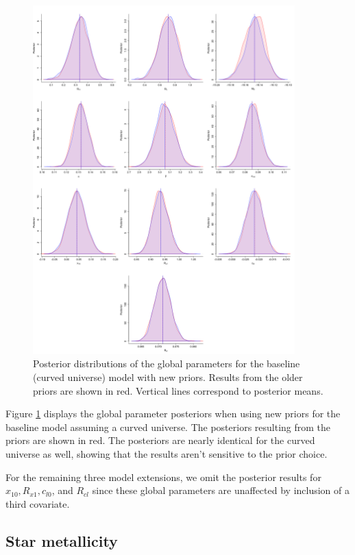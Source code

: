 \begin{figure}
\centering
	\includegraphics[width=0.9\textwidth]{figures/ode/base_curv_all.png}
\caption{Posterior distributions of the global parameters for the baseline (curved universe) model with new priors. Results from the older priors are shown in red. Vertical lines correspond to posterior means.}
\label{fig:ode_base_curv}
\end{figure}

Figure \ref{fig:ode_base_curv} displays the global parameter posteriors when using new priors for the baseline model assuming a curved universe. The posteriors resulting from the \citet{Shariff+others:2016} priors are shown in red. The posteriors are nearly identical for the curved universe as well, showing that the results aren't sensitive to the prior choice.

For the remaining three model extensions, we omit the posterior results for $x_{10}, R_{x1}, c_{l0}$, and $R_{cl}$ since these global parameters are unaffected by inclusion of a third covariate. 

\subsection{Star metallicity}
\label{sec:ode_results_metallicity}

